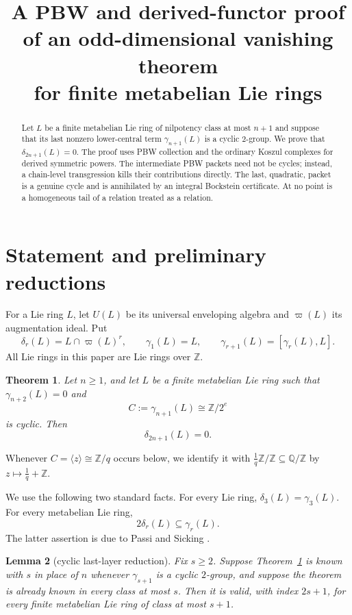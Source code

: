 \documentclass[11pt]{amsart}
\title[Odd-dimensional vanishing for finite metabelian Lie rings]
{A PBW and derived-functor proof of an odd-dimensional vanishing theorem\\
for finite metabelian Lie rings}
\author{}
\date{}
\newtheorem{theorem}{Theorem}[section]
\newtheorem{lemma}[theorem]{Lemma}
\theoremstyle{remark}
\newcommand{\Z}{\mathbb Z}
\newcommand{\Q}{\mathbb Q}
\newcommand{\gm}{\gamma}
\newcommand{\aug}{\varpi}
\begin{document}
\begin{abstract}
Let $L$ be a finite metabelian Lie ring of nilpotency class at most
$n+1$ and suppose that its last nonzero lower-central term
$\gamma_{n+1}(L)$ is a cyclic $2$-group.  We prove that
$\delta_{2n+1}(L)=0$.  The proof uses PBW collection and the ordinary
Koszul complexes for derived symmetric powers.  The intermediate PBW
packets need not be cycles; instead, a chain-level transgression kills
their contributions directly.  The last, quadratic, packet is a genuine
cycle and is annihilated by an integral Bockstein certificate.  At no
point is a homogeneous tail of a relation treated as a relation.
\end{abstract}

\maketitle

\section{Statement and preliminary reductions}

For a Lie ring $L$, let $U(L)$ be its universal enveloping algebra and
$\aug(L)$ its augmentation ideal.  Put
\[
 \delta_r(L)=L\cap\aug(L)^r,
 \qquad
 \gm_1(L)=L,
 \qquad
 \gm_{r+1}(L)=[\gm_r(L),L].
\]
All Lie rings in this paper are Lie rings over $\Z$.

\begin{theorem}\label{thm:main}
Let $n\geq1$, and let $L$ be a finite metabelian Lie ring such that
$\gm_{n+2}(L)=0$ and
\[
 C:=\gm_{n+1}(L)\cong\Z/2^e
\]
is cyclic.  Then
\[
                         \delta_{2n+1}(L)=0.
\]
\end{theorem}

Whenever $C=\langle z\rangle\cong\Z/q$ occurs below, we identify it
with $\frac1q\Z/\Z\subseteq\Q/\Z$ by $z\mapsto\frac1q+\Z$.

We use the following two standard facts.  For every Lie ring,
$\delta_3(L)=\gm_3(L)$.  For every metabelian Lie ring,
\begin{equation}\label{eq:PS}
                         2\delta_r(L)\subseteq\gm_r(L).
\end{equation}
The latter assertion is due to Passi and Sicking
\cite[Theorem~2.1]{PS}.

\begin{lemma}[cyclic last-layer reduction]\label{lem:cyclic-reduction}
Fix $s\geq2$.  Suppose Theorem~\ref{thm:main} is known with $s$ in
place of $n$ whenever $\gm_{s+1}$ is a cyclic $2$-group, and suppose
the theorem is already known in every class at most $s$.  Then it is
valid, with index $2s+1$, for every finite metabelian Lie ring of
class at most $s+1$.
\end{lemma}
\end{document}
